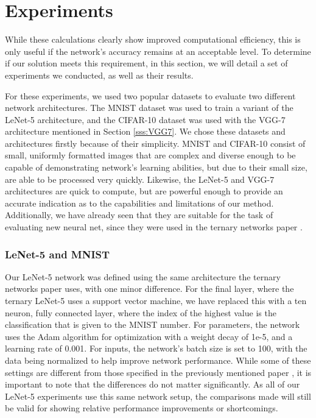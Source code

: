 \documentclass[11pt,a4paper,oldfontcommands]{memoir}
\begin{document}
\chapter{Experiments}

While these calculations clearly show improved computational efficiency, this is only useful if the network's accuracy remains at an acceptable level. To determine if our solution meets this requirement, in this section, we will detail a set of experiments we conducted, as well as their results. 

For these experiments, we used two popular datasets to evaluate two different network architectures. The MNIST \cite{mnist} dataset was used to train a variant of the LeNet-5 \cite{lenet5} architecture, and the CIFAR-10 \cite{cifar} dataset was used with the VGG-7 \cite{ternary} architecture mentioned in Section \ref{sss:VGG7}. We chose these datasets and architectures firstly because of their simplicity. MNIST and CIFAR-10 consist of small, uniformly formatted images that are complex and diverse enough to be capable of demonstrating network's learning abilities, but due to their small size, are able to be processed very quickly. Likewise, the LeNet-5 and VGG-7 architectures are quick to compute, but are powerful enough to provide an accurate indication as to the capabilities and limitations of our method. Additionally, we have already seen that they are suitable for the task of evaluating new neural net, since they were used in the ternary networks paper \cite{ternary}.

\subsection{LeNet-5 and MNIST}
Our LeNet-5 network was defined using the same architecture the ternary networks paper \cite{ternary} uses, with one minor difference. For the final layer, where the ternary LeNet-5 uses a support vector machine, we have replaced this with a ten neuron, fully connected layer, where the index of the highest value is the classification that is given to the MNIST number. For parameters, the network uses the Adam algorithm for optimization with a weight decay of 1e-5, and a learning rate of 0.001. For inputs, the network's batch size is set to 100, with the data being normalized to help improve network performance. While some of these settings are different from those specified in the previously mentioned paper \cite{ternary}, it is important to note that the differences do not matter significantly. As all of our LeNet-5 experiments use this same network setup, the comparisons made will still be valid for showing relative performance improvements or shortcomings. 
\end{document}
